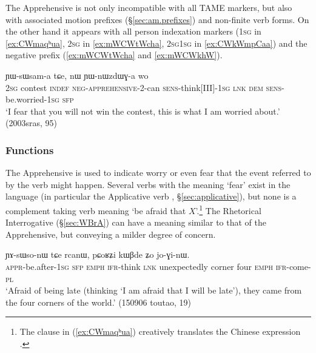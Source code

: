 The Apprehensive is not only incompatible with all TAME markers, but also with associated motion prefixes (§\ref{sec:am.prefixes}) and non-finite verb forms. On the other hand it appears with all person indexation markers (\textsc{1sg} in \ref{ex:CWmaqʰua}, \textsc{2sg} in \ref{ex:mWCWtWcha}, 2\textsc{sg}\fl{}1\textsc{sg} in \ref{ex:CWkWmpCaa}) and the negative prefix  (\ref{ex:mWCWtWcha} and \ref{ex:mWCWkhW}). 

  \begin{exe}
\ex \label{ex:mWCWtWcha}
 ɲɯ-sɯsam-a tɕe, nɯ ɲɯ-nɯzdɯɣ-a wo \\
\textsc{2sg} contest \textsc{indef} \textsc{neg}-\textsc{apprehensive}-2-can \textsc{sens}-think[III]-\textsc{1sg} \textsc{lnk} \textsc{dem} \textsc{sens}-be.worried-\textsc{1sg} \textsc{sfp} \\
\glt  `I fear that you will not win the contest, this is what I am worried about.' (2003sras, 95)
 \end{exe}

\subsubsection{Functions} \label{sec:apprehensive.function}
The Apprehensive is used to indicate worry or even fear that the event referred to by the verb might happen. Several verbs with the meaning `fear' exist in the language (in particular the Applicative verb , §\ref{sec:applicative}), but none is a complement taking verb meaning `be afraid that $X$'.\footnote{The clause     in (\ref{ex:CWmaqʰua}) creatively translates the Chinese expression . }     The Rhetorical Interrogative (§\ref{sec:WBrA}) can have a meaning similar to that of the Apprehensive, but conveying a milder degree of concern.

\begin{exe}
\ex \label{ex:CWmaqʰua}
\gll  [ɕɯ-maqʰu-a kɯ ʑo] ɲɤ-sɯso-nɯ tɕe rcanɯ, pɕoʁʑi kɯβde ʑo jo-ɣi-nɯ.  \\
\textsc{appr}-be.after-\textsc{1sg} \textsc{sfp} \textsc{emph} \textsc{ifr}-think \textsc{lnk} unexpectedly corner four \textsc{emph} \textsc{ifr}-come-\textsc{pl} \\
\glt `Afraid of being late (thinking `I am afraid that I will be late'), they came from the four corners of the world.' (150906 toutao, 19)
 \end{exe}
 
